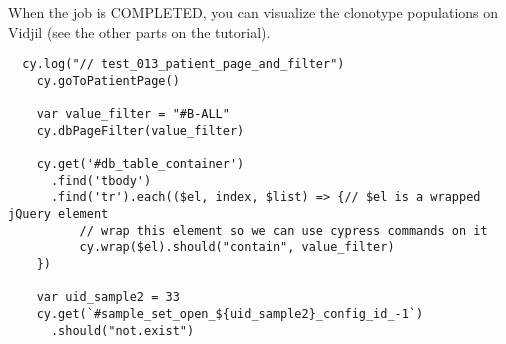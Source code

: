 When the job is COMPLETED, 
you can visualize the clonotype populations on Vidjil
(see the other parts on the tutorial).


\begin{verbatim}
  cy.log("// test_013_patient_page_and_filter")
    cy.goToPatientPage()
  
    var value_filter = "#B-ALL"
    cy.dbPageFilter(value_filter)

    cy.get('#db_table_container')
      .find('tbody')
      .find('tr').each(($el, index, $list) => {// $el is a wrapped jQuery element
          // wrap this element so we can use cypress commands on it
          cy.wrap($el).should("contain", value_filter)
    })
    
    var uid_sample2 = 33
    cy.get(`#sample_set_open_${uid_sample2}_config_id_-1`)
      .should("not.exist")

\end{verbatim}

